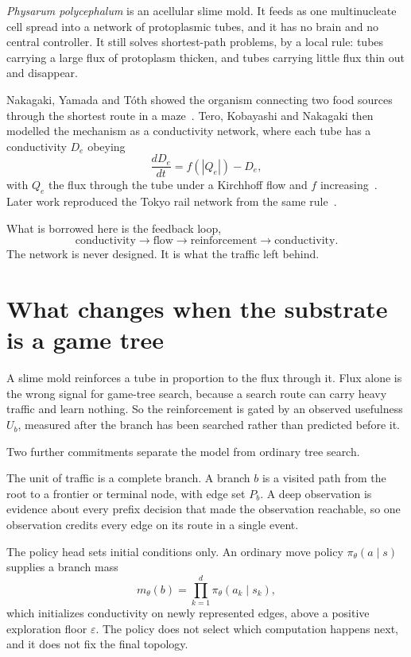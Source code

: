 \documentclass[11pt,a4paper]{article}
\theoremstyle{definition}
\begin{document}
\emph{Physarum polycephalum} is an acellular slime mold. It feeds as one
multinucleate cell spread into a network of protoplasmic tubes, and it has no
brain and no central controller. It still solves shortest-path problems, by a
local rule: tubes carrying a large flux of protoplasm thicken, and tubes
carrying little flux thin out and disappear.

Nakagaki, Yamada and T\'oth showed the organism connecting two food sources
through the shortest route in a maze~\cite{nakagaki2000}. Tero, Kobayashi and
Nakagaki then modelled the mechanism as a conductivity network, where each tube
has a conductivity $D_e$ obeying
\begin{equation}
  \frac{dD_e}{dt} = f(|Q_e|) - D_e ,
\end{equation}
with $Q_e$ the flux through the tube under a Kirchhoff flow and $f$
increasing~\cite{tero2007}. Later work reproduced the Tokyo rail network from
the same rule~\cite{tero2010}.

What is borrowed here is the feedback loop,
\begin{equation}
  \text{conductivity} \rightarrow \text{flow} \rightarrow \text{reinforcement}
  \rightarrow \text{conductivity} .
\end{equation}
The network is never designed. It is what the traffic left behind.

\section{What changes when the substrate is a game tree}

A slime mold reinforces a tube in proportion to the flux through it. Flux alone
is the wrong signal for game-tree search, because a search route can carry
heavy traffic and learn nothing. So the reinforcement is gated by an observed
usefulness $U_b$, measured after the branch has been searched rather than
predicted before it.

Two further commitments separate the model from ordinary tree search.

The unit of traffic is a complete branch. A branch $b$ is a visited path from
the root to a frontier or terminal node, with edge set $P_b$. A deep
observation is evidence about every prefix decision that made the observation
reachable, so one observation credits every edge on its route in a single
event.

The policy head sets initial conditions only. An ordinary move policy
$\pi_\theta(a \mid s)$ supplies a branch mass
\begin{equation}
  m_\theta(b) = \prod_{k=1}^{d} \pi_\theta(a_k \mid s_k),
\end{equation}
which initializes conductivity on newly represented edges, above a positive
exploration floor $\varepsilon$. The policy does not select which computation
happens next, and it does not fix the final topology.
\end{document}
